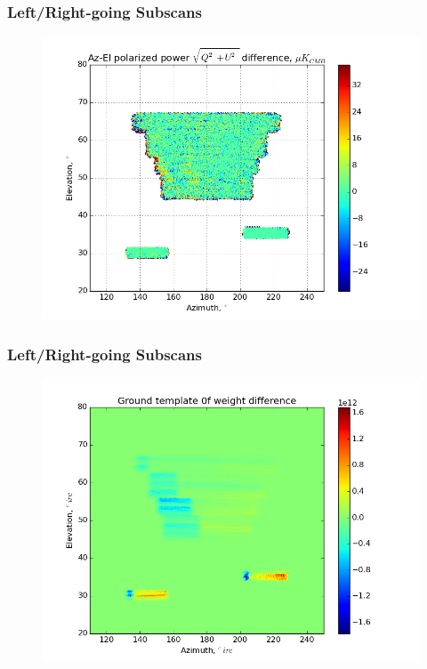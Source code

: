 \documentclass{beamer}
\begin{document}
\begin{frame}
\frametitle{Left/Right-going Subscans}
\begin{figure}
\includegraphics[width=0.9\linewidth]{dMag_gt_LR_SUBSCAN.png}
\end{figure}
\end{frame}

\begin{frame}
\frametitle{Left/Right-going Subscans}
\begin{figure}
\includegraphics[width=0.9\linewidth]{dw0_gt_LR_SUBSCAN.png}
\end{figure}
\end{frame}
\end{document}
